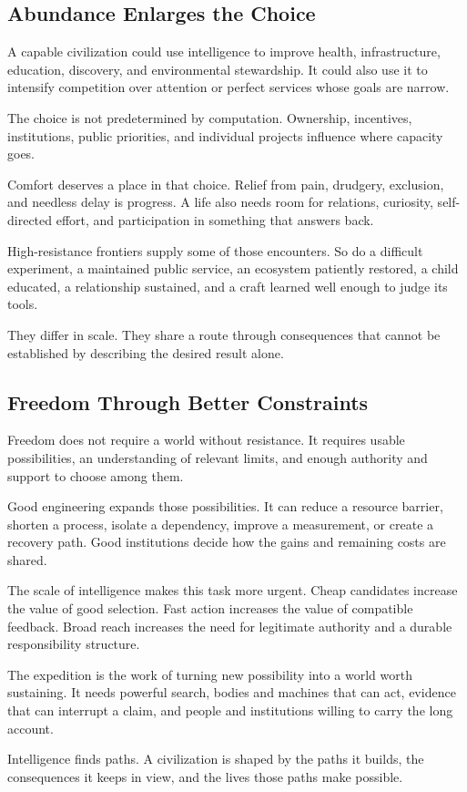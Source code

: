 \subsection{Abundance Enlarges the Choice}

A capable civilization could use intelligence to improve health, infrastructure, education, discovery, and environmental stewardship. It could also use it to intensify competition over attention or perfect services whose goals are narrow.

The choice is not predetermined by computation. Ownership, incentives, institutions, public priorities, and individual projects influence where capacity goes.

Comfort deserves a place in that choice. Relief from pain, drudgery, exclusion, and needless delay is progress. A life also needs room for relations, curiosity, self-directed effort, and participation in something that answers back.

High-resistance frontiers supply some of those encounters. So do a difficult experiment, a maintained public service, an ecosystem patiently restored, a child educated, a relationship sustained, and a craft learned well enough to judge its tools.

They differ in scale. They share a route through consequences that cannot be established by describing the desired result alone.

\subsection{Freedom Through Better Constraints}

Freedom does not require a world without resistance. It requires usable possibilities, an understanding of relevant limits, and enough authority and support to choose among them.

Good engineering expands those possibilities. It can reduce a resource barrier, shorten a process, isolate a dependency, improve a measurement, or create a recovery path. Good institutions decide how the gains and remaining costs are shared.

The scale of intelligence makes this task more urgent. Cheap candidates increase the value of good selection. Fast action increases the value of compatible feedback. Broad reach increases the need for legitimate authority and a durable responsibility structure.

The expedition is the work of turning new possibility into a world worth sustaining. It needs powerful search, bodies and machines that can act, evidence that can interrupt a claim, and people and institutions willing to carry the long account.

Intelligence finds paths. A civilization is shaped by the paths it builds, the consequences it keeps in view, and the lives those paths make possible.
